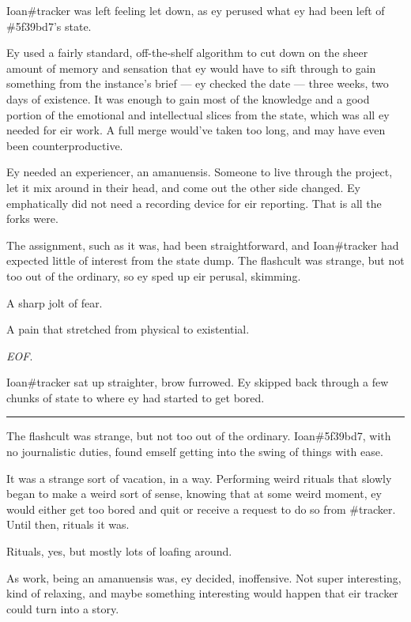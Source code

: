 Ioan\#tracker was left feeling let down, as ey perused what ey had been left of \#5f39bd7's state.

Ey used a fairly standard, off-the-shelf algorithm to cut down on the sheer amount of memory and sensation that ey would have to sift through to gain something from the instance's brief --- ey checked the date --- three weeks, two days of existence. It was enough to gain most of the knowledge and a good portion of the emotional and intellectual slices from the state, which was all ey needed for eir work. A full merge would've taken too long, and may have even been counterproductive.

Ey needed an experiencer, an amanuensis. Someone to live through the project, let it mix around in their head, and come out the other side changed. Ey emphatically did not need a recording device for eir reporting. That is all the forks were.

The assignment, such as it was, had been straightforward, and Ioan\#tracker had expected little of interest from the state dump. The flashcult was strange, but not too out of the ordinary, so ey sped up eir perusal, skimming.

A sharp jolt of fear.

A pain that stretched from physical to existential.

\emph{EOF}.

Ioan\#tracker sat up straighter, brow furrowed. Ey skipped back through a few chunks of state to where ey had started to get bored.

\begin{center}\rule{0.5\linewidth}{0.5pt}\end{center}

The flashcult was strange, but not too out of the ordinary. Ioan\#5f39bd7, with no journalistic duties, found emself getting into the swing of things with ease.

It was a strange sort of vacation, in a way. Performing weird rituals that slowly began to make a weird sort of sense, knowing that at some weird moment, ey would either get too bored and quit or receive a request to do so from \#tracker. Until then, rituals it was.

Rituals, yes, but mostly lots of loafing around.

As work, being an amanuensis was, ey decided, inoffensive. Not super interesting, kind of relaxing, and maybe something interesting would happen that eir tracker could turn into a story.


